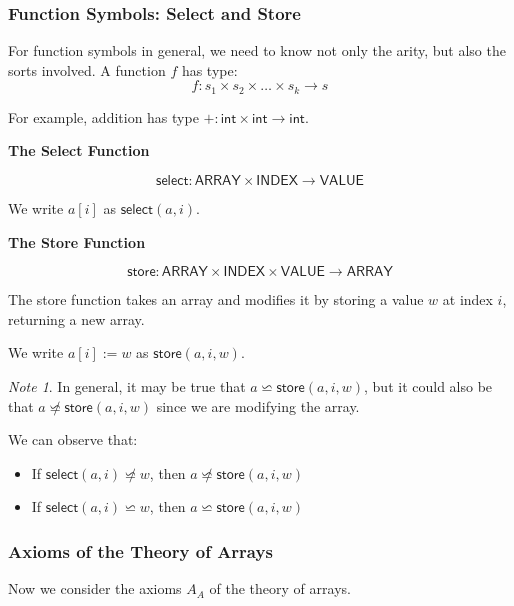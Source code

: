 \documentclass[11pt,a4paper]{article}
\theoremstyle{definition}
\theoremstyle{plain}
\theoremstyle{remark}
\newtheorem*{remark}{Note}
\begin{document}
\subsubsection{Function Symbols: Select and Store}

For function symbols in general, we need to know not only the arity, but also the sorts involved. A function $f$ has type:
\[
f: s_1 \times s_2 \times \dots \times s_k \rightarrow s
\]

For example, addition has type $+: \textsf{int} \times \textsf{int} \rightarrow \textsf{int}$.

\begin{center}
\textbf{The Select Function}
\end{center}

\[
\textsf{select}: \textsf{ARRAY} \times \textsf{INDEX} \rightarrow \textsf{VALUE}
\]

We write $a[i]$ as $\textsf{select}(a, i)$.

\begin{center}
\textbf{The Store Function}
\end{center}

\[
\textsf{store}: \textsf{ARRAY} \times \textsf{INDEX} \times \textsf{VALUE} \rightarrow \textsf{ARRAY}
\]

The store function takes an array and modifies it by storing a value $w$ at index $i$, returning a new array.

We write $a[i] := w$ as $\textsf{store}(a, i, w)$.

\begin{remark}
In general, it may be true that $a \backsimeq \textsf{store}(a, i, w)$, but it could also be that $a \not\backsimeq \textsf{store}(a, i, w)$ since we are modifying the array.

We can observe that:
\begin{itemize}
    \item If $\textsf{select}(a, i) \not\backsimeq w$, then $a \not\backsimeq \textsf{store}(a, i, w)$
    \item If $\textsf{select}(a, i) \backsimeq w$, then $a \backsimeq \textsf{store}(a, i, w)$
\end{itemize}
\end{remark}
\subsubsection{Axioms of the Theory of Arrays}

Now we consider the axioms $A_A$ of the theory of arrays.
\end{document}
